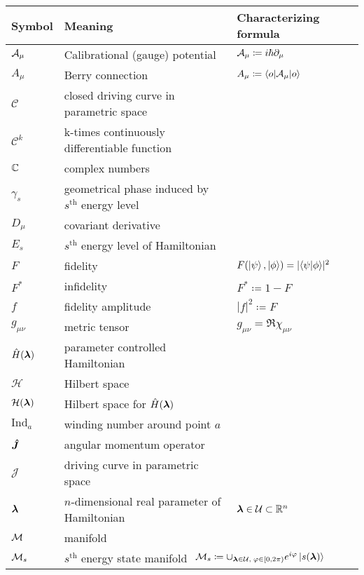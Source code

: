 

\vspace{-14pt}\begin{tabular} {@{}C{1.9cm}@{}p{8cm}@{}C{3.77cm}}
	\toprule
	\textbf{Symbol}& \textbf{Meaning}& \hspace{-30pt}\textbf{Characterizing formula}\\\bottomrule
	$\mathcal{A}_\mu$ & Calibrational (gauge) potential & $\mathcal{A}_\mu\coloneqq i\hbar \partial_\mu$ \\
	$A_\mu$ & Berry connection & $A_\mu\coloneqq \braket{o|\mathcal{A}_\mu|o}$ \\
	$\mathcal C$ & closed driving curve in parametric space &  \\
	$\mathcal{C}^k$ & k-times continuously differentiable function \\
	$\mathbb{C}$ & complex numbers & \\
	  $\gamma_s$& geometrical phase induced by $s^{\text{th}}$ energy level &  \\
	  $D_\mu$&covariant derivative  &  \\
	  $E_s$&$s^{\text{th}}$ energy level of Hamiltonian &  \\
	  $F$& fidelity & \hspace{-7pt}$F(\ket{\psi},\ket{\phi})=|\!\braket{\psi|\phi}\!|^2$  \\
	  $F^*$& infidelity & $F^*\coloneqq 1-F$  \\
	  $f$& fidelity amplitude  & $|f|^2\coloneqq F$  \\
	  $g_{\mu\nu}$& metric tensor& $g_{\mu\nu}= \Re\chi_{\mu\nu}$ \\
	  $\hat{H}({\bm\lambda})$& parameter controlled Hamiltonian  &  \\ 
	  $\mathcal H$& Hilbert space  &  \\ 
	  $\mathcal H({\bm\lambda})$& Hilbert space for $\hat{H}({\bm\lambda})$ &  \\ 
	  $\mathrm{Ind}_a$ & winding number around point $a$ & \\
	  $\bm{\hat{J}}$ & angular momentum operator & \\
	  $\mathcal J$ & driving curve in parametric space &  \\
	  ${\bm\lambda}$& $n$-dimensional real parameter of Hamiltonian &${\bm\lambda}\in \mathcal U\subset \mathbb{R}^n$  \\
	  $\mathcal{M}$& manifold &  \\
	  $\mathcal{M}_s$& $s^{\text{th}}$ energy state manifold & $\hspace{-43pt}\M_s\coloneqq\cup_{\llambda\in\mathcal U,\;\varphi\in[0,2\pi)} e^{i\varphi}\ket{s(\llambda)}$ \\

\end{tabular}

